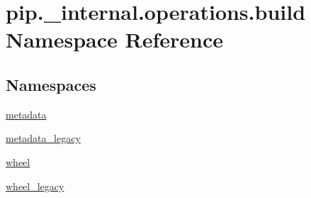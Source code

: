 \hypertarget{namespacepip_1_1__internal_1_1operations_1_1build}{}\section{pip.\+\_\+internal.\+operations.\+build Namespace Reference}
\label{namespacepip_1_1__internal_1_1operations_1_1build}
\subsection*{Namespaces}
\begin{DoxyCompactItemize}
\item 
 \hyperlink{namespacepip_1_1__internal_1_1operations_1_1build_1_1metadata}{metadata}
\item 
 \hyperlink{namespacepip_1_1__internal_1_1operations_1_1build_1_1metadata__legacy}{metadata\+\_\+legacy}
\item 
 \hyperlink{namespacepip_1_1__internal_1_1operations_1_1build_1_1wheel}{wheel}
\item 
 \hyperlink{namespacepip_1_1__internal_1_1operations_1_1build_1_1wheel__legacy}{wheel\+\_\+legacy}
\end{DoxyCompactItemize}
